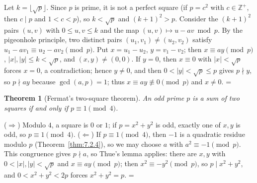 \documentclass[11pt]{article}
\makeatletter
\let\nt@closedisplay\]
\def\nt@guardedclose{\@ifnextchar\par{\nt@closeafterpar}{\@ifnextchar\end{\postdisplaypenalty\@M\nt@closedisplay}{\nt@closedisplay}}}
\def\nt@closeafterpar\par{\@ifnextchar\par{\nt@closeafterpar}{\@ifnextchar\end{\postdisplaypenalty\@M\nt@closedisplay\par}{\nt@closedisplay\par}}}
\renewenvironment{proof}[1][\proofname]{\par
  \pushQED{\qed}\normalfont\topsep\medskipamount\edef\nt@afterproof{\@endparpenalty=\the\@endparpenalty\relax}\@beginparpenalty\@M\@endparpenalty\@M\let\]\nt@guardedclose\trivlist\item[]\textit{#1\@addpunct{.}} \ignorespaces}{\ifvmode\addpenalty\@M\fi\popQED\nt@afterproof\endtrivlist\@endpefalse}
\theoremstyle{ntstyle}
\newtheorem{theorem}{Theorem}[subsection]
\makeatother
\begin{document}
\begin{proof} Let $k = \lfloor \sqrt{p} \rfloor$. Since $p$ is
  prime, it is not a perfect square (if $p = c^{2}$ with $c \in \mathbb{Z}^+$,
  then $c \mid p$ and $1 < c < p$), so $k < \sqrt{p}$ and $(k+1)^2 > p$. Consider the $(k+1)^2$ pairs $(u, v)$
  with $0 \le u, v \le k$ and the map $(u, v) \mapsto u - a v \bmod p$.
  By the pigeonhole principle, two distinct pairs $(u_1, v_1) \neq (u_2, v_2)$ satisfy
  $u_1 - a v_1 \equiv u_2 - a v_2 \pmod{p}$. Put $x = u_1 - u_2$, $y = v_1 - v_2$; then $x \equiv a y \pmod{p}$,
  $|x|, |y| \le k < \sqrt{p}$,
  and $(x,y) \neq (0,0)$. If $y = 0$, then $x \equiv 0$ with $|x| < \sqrt{p}$
  forces $x = 0$, a contradiction; hence $y \neq 0$, and then $0 < |y| < \sqrt{p} \le p$ gives $p \nmid y$, so
  $p \nmid ay$ because $\gcd(a, p) = 1$; thus $x \equiv ay \not\equiv 0 \pmod{p}$ and $x \neq 0$.
\end{proof}

\begin{theorem}[Fermat's two-square theorem]\label{thm:8.1.2}\label{thm:fermat-two-square-theorem}
  An
  odd prime $p$ is a sum of two squares if and only if $p \equiv 1 \pmod{4}$.

\end{theorem}

\begin{proof} ($\Rightarrow$) Modulo $4$, a square is $0$
  or $1$; if $p = x^2 + y^2$ is odd, exactly one of $x, y$ is odd, so
  $p \equiv 1 \pmod{4}$. ($\Leftarrow$) If $p \equiv 1 \pmod{4}$, then
  $-1$ is a quadratic residue modulo $p$ (Theorem~\ref{thm:7.2.4}), so we may choose $a$ with
  $a^2 \equiv -1 \pmod{p}$. This congruence gives $p\nmid a$, so Thue's
  lemma applies: there are $x, y$ with $0 < |x|, |y| < \sqrt{p}$ and $x \equiv a y \pmod{p}$; then
  $x^2 \equiv -y^2 \pmod{p}$, so $p \mid x^2 + y^2$, and $0 < x^2 + y^2 < 2p$ forces $x^2 + y^2 = p$.
\end{proof}
\end{document}
